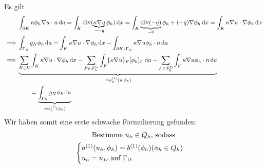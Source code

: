 Es gilt
\begin{align*}
	&\int_{\partial K} \kappa \phi_h \nabla u \cdot n \diff a = \int_K \dive(\underbrace{\kappa \nabla u}_{= -q} \phi_h) \diff x = \int_K \underbrace{\dive(-q)}_{=0} \phi_h + (-q) \nabla \phi_h \diff x = \int_K \kappa \nabla u \cdot \nabla \phi_h \diff x\\
	\implies &\int_{\GammaN} g_N \phi_h \diff a = \int_K \kappa \nabla u \cdot \nabla \phi_h \diff x - \int_{\partial K \setminus \GammaN} \kappa \nabla u \phi_h \cdot n \diff a\\
	\implies &\underbrace{\sum_{K \in \mathcal{K}} \int_K \kappa \nabla u \cdot \nabla \phi_h \diff x - \sum_{F \in \FIn} \int_{F} \{\kappa \nabla u \}_F [\phi_h]_F \diff a - \sum_{F \in \FD} \int_{F} \kappa \nabla u \phi_h \cdot n \diff a}_{\coloneqq a^{(1)}_h(u,\phi_h)}\\
	&\qquad = \underbrace{\int_{\GammaN} g_N \phi_h \diff a}_{\coloneqq b^{(1)}_h(\phi_h)}\\
\end{align*}
Wir haben somit eine erste schwache Formulierung gefunden:
\begin{gather*}
\text{Bestimme } u_h \in Q_h \text{, sodass}\\
\begin{cases}
	a^{(1)}(u_h,\phi_h) = b^{(1)}(\phi_h) (\phi_h \in Q_h)\\
	u_h = u_D \text{ auf }\Gamma_{\text{D}}
\end{cases}
\end{gather*}

